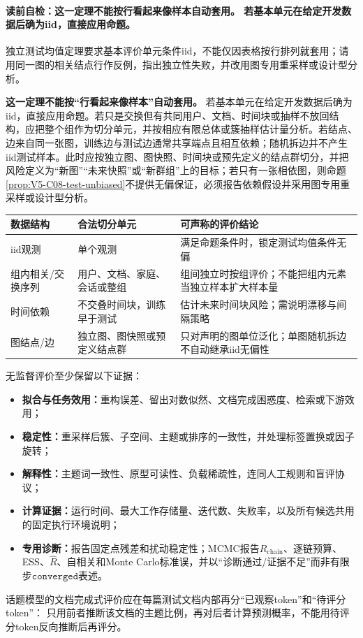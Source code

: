 \paragraph{读前自检：这一定理不能按行看起来像样本自动套用。 若基本单元在给定开发数据后确为iid，直接应用命题。}独立测试均值定理要求基本评价单元条件iid，不能仅因表格按行排列就套用；请用同一图的相关结点行作反例，指出独立性失败，并改用图专用重采样或设计型分析。\par

\begin{keypointbox}
\textbf{这一定理不能按“行看起来像样本”自动套用。}
若基本单元在给定开发数据后确为iid，直接应用命题。若只是交换但有共同用户、文档、时间块或抽样不放回结构，应把整个组作为切分单元，并按相应有限总体或簇抽样估计量分析。若结点、边来自同一张图，训练边与测试边通常共享端点且相互依赖；随机拆边并不产生iid测试样本。此时应按独立图、图快照、时间块或预先定义的结点群切分，并把风险定义为“新图”“未来快照”或“新群组”上的目标；若只有一张相依图，则命题\ref{prop:V5-C08-test-unbiased}不提供无偏保证，必须报告依赖假设并采用图专用重采样或设计型分析。
\end{keypointbox}

\begin{center}
\small
\begin{tabularx}{\textwidth}{@{}p{}XX@{}}
\toprule
数据结构 & 合法切分单元 & 可声称的评价结论 \\
\midrule
iid观测 & 单个观测 & 满足命题条件时，锁定测试均值条件无偏 \\
组内相关/交换序列 & 用户、文档、家庭、会话或整组 & 组间独立时按组评价；不能把组内元素当独立样本扩大样本量 \\
时间依赖 & 不交叠时间块，训练早于测试 & 估计未来时间块风险；需说明漂移与间隔策略 \\
图结点/边 & 独立图、图快照或预定义结点群 & 只对声明的图单位泛化；单图随机拆边不自动继承iid无偏性 \\
\bottomrule
\end{tabularx}
\end{center}

无监督评价至少保留以下证据：
\begin{itemize}[leftmargin=2em]
  \item \textbf{拟合与任务效用：}重构误差、留出对数似然、文档完成困惑度、检索或下游效用；
  \item \textbf{稳定性：}重采样后簇、子空间、主题或排序的一致性，并处理标签置换或因子旋转；
  \item \textbf{解释性：}主题词一致性、原型可读性、负载稀疏性，连同人工规则和盲评协议；
  \item \textbf{计算证据：}运行时间、最大工作存储量、迭代数、失败率，以及所有候选共用的固定执行环境说明；
  \item \textbf{专用诊断：}\PageRank{}报告固定点残差和扰动稳定性；MCMC报告$R_{\mathrm{chain}}$、逐链预算、ESS、$\widehat R$、自相关和Monte Carlo标准误，并以“诊断通过/证据不足”而非有限步$\mathtt{converged}$表述。
\end{itemize}
话题模型的文档完成式评价应在每篇测试文档内部再分“已观察token”和“待评分token”：
只用前者推断该文档的主题比例，再对后者计算预测概率，不能用待评分token反向推断后再评分。

